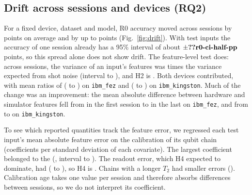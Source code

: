 \subsection{Drift across sessions and devices (RQ2)}
\label{sec:rq2}
For a fixed device, dataset and model, R0 accuracy moved across sessions by
 points on average and by up to  points
(Fig.~\ref{fig:drift}). With  test inputs the accuracy of one session already has a
95\% interval of about $\pm\val{r0-ci-half-pp}$ points, so this spread alone does not show drift.
The feature-level test does: across sessions, the variance of an input's features was
 times the variance expected from shot noise (interval  to ),
and H2 is . Both devices contributed, with mean ratios of 
( to ) on \texttt{ibm\_fez} and 
( to ) on \texttt{ibm\_kingston}. %
Much of the change was an improvement: the mean absolute difference between hardware and
simulator features fell from  in the first session to  in the
last on \texttt{ibm\_fez}, and from  to  on
\texttt{ibm\_kingston}. %

To see which reported quantities track the feature error, we regressed each test input's mean
absolute feature error on the calibration of its qubit chain (coefficients per standard
deviation of each covariate). The largest coefficient belonged to the 
(, interval  to ). The readout
error, which H4 expected to dominate, had  ( to
), so H4 is . %
Chains with a longer $T_2$ had smaller errors (). %
Calibration age takes one value per session and therefore absorbs differences between
sessions, so we do not interpret its coefficient.

